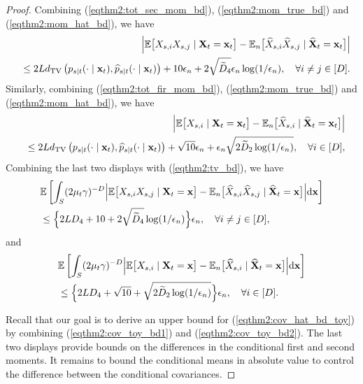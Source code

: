 \documentclass[11pt,a4paper,final]{article}
\numberwithin{equation}{section}
\theoremstyle{remark}
\newcommand{\bx}{{\bf x}}
\newcommand{\bX}{{\bf X}}
\newcommand{\bbE}{{\mathbb E}}
\newcommand{\be}{\begin{equation}}
\newcommand{\ee}{\end{equation}}
\newcommand{\bean}{\setlength\arraycolsep{1pt}\begin{eqnarray*}}
\newcommand{\eean}{\end{eqnarray*}}
\def\d{{\rm d}}
\begin{document}
\begin{proof}
Combining (\ref{eqthm2:tot_sec_mom_bd}),  (\ref{eqthm2:mom_true_bd}) and (\ref{eqthm2:mom_hat_bd}), we have
\bean
&& \Big\vert \bbE \big[  X_{s,i}  X_{s ,j} \mid  \bX_{t} = \bx_{t} \big] - \bbE_n \big[ \widehat X_{s,i} \widehat X_{s ,j} \mid \widehat \bX_{t} = \bx_{t} \big]  \Big\vert
\\
&& \leq 2 L d_{\rm TV} \left( p_{s \mid t}(\cdot \mid \bx_{t} ), \widehat p_{s \mid t}(\cdot \mid \bx_{t} ) \right)
+ 10 \epsilon_n 
+  2 \sqrt{\widetilde D_{4}}  \epsilon_{n}   \log (1/\epsilon_n),
\quad \forall i \neq j \in [D].
\eean
Similarly, combining (\ref{eqthm2:tot_fir_mom_bd}), (\ref{eqthm2:mom_true_bd}) and (\ref{eqthm2:mom_hat_bd}), we have
\bean
&& \Big\vert \bbE \big[  X_{s,i}  \mid  \bX_{t} = \bx_{t} \big] - \bbE_n \big[ \widehat X_{s,i} \mid \widehat \bX_{t} = \bx_{t} \big]  \Big\vert
\\
&& \leq 2 L d_{\rm TV} \left( p_{s \mid t}(\cdot \mid \bx_{t} ), \widehat p_{s \mid t}(\cdot \mid \bx_{t} ) \right)
+ \sqrt{10} \epsilon_n 
+ \epsilon_n \sqrt{ 2 \widetilde D_{2} \log (1/\epsilon_n) },
\quad \forall i \in [D],
\eean
Combining the last two displays with (\ref{eqthm2:tv_bd}), we have
\be
\begin{split}
& \bbE \left[ \int_{S} (2 \mu_{t} \gamma)^{-D} \Big\vert \bbE \big[  X_{s,i}  X_{s ,j} \mid  \bX_{t} = \bx \big] - \bbE_n \big[ \widehat X_{s,i} \widehat X_{s ,j} \mid \widehat \bX_{t} = \bx \big]  \Big\vert  \d \bx \right]
\\
& \leq \Big\{ 2 L D_{4}  + 10 + 2 \sqrt{\widetilde D_{4}} \log (1/\epsilon_n) \Big\} \epsilon_n, 
\quad \forall i \neq j \in [D],
\end{split}
\label{eqthm2:sec_hat_bd}
\ee
and
\be
\begin{split}
& \bbE \left[ \int_{S} (2 \mu_{t} \gamma)^{-D} \Big\vert \bbE \big[  X_{s,i} \mid  \bX_{t} = \bx \big] - \bbE_n \big[ \widehat X_{s,i} \mid \widehat \bX_{t} = \bx \big]  \Big\vert \d \bx \right] 
\\
& \leq \Big\{ 2 L D_{4} + \sqrt{10} + \sqrt{ 2 \widetilde D_{2} \log (1/\epsilon_n) } \Big\} \epsilon_n,
\quad \forall i \in [D].
\end{split}
\label{eqthm2:fir_hat_bd}
\ee

Recall that our goal is to derive an upper bound for (\ref{eqthm2:cov_hat_bd_toy}) by combining (\ref{eqthm2:cov_toy_bd1}) and (\ref{eqthm2:cov_toy_bd2}).
The last two displays provide bounds on the differences in the conditional first and second moments.
It remains to bound the conditional means in absolute value to control the difference between the conditional covariances.


\end{proof}
\end{document}
